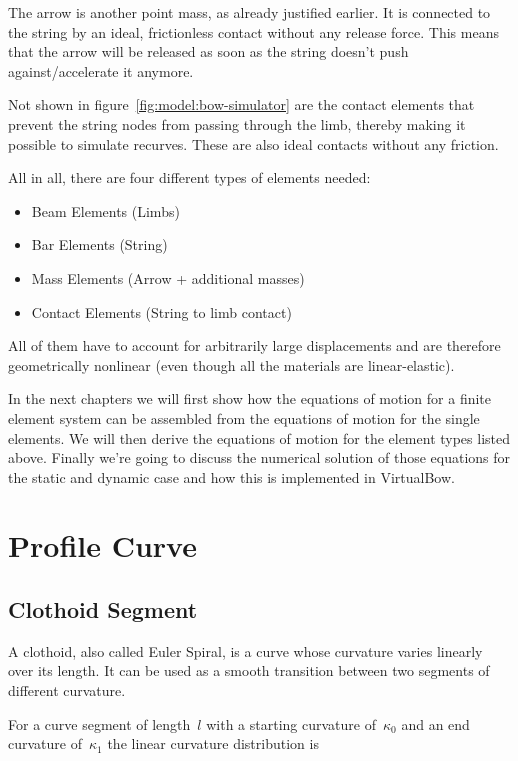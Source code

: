 The arrow is another point mass, as already justified earlier. It is connected to the string by an ideal, frictionless contact without any release force. This means that the arrow will be released as soon as the string doesn't push against/accelerate it anymore.

Not shown in figure~\ref{fig:model:bow-simulator} are the contact elements that prevent the string nodes from passing through the limb, thereby making it possible to simulate recurves. These are also ideal contacts without any friction.

All in all, there are four different types of elements needed:

\begin{itemize}
\item Beam Elements (Limbs)
\item Bar Elements (String)
\item Mass Elements (Arrow + additional masses)
\item Contact Elements (String to limb contact)
\end{itemize}

All of them have to account for arbitrarily large displacements and are therefore geometrically nonlinear (even though all the materials are linear-elastic).

In the next chapters we will first show how the equations of motion for a finite element system can be assembled from the equations of motion for the single elements. We will then derive the equations of motion for the element types listed above. Finally we're going to discuss the numerical solution of those equations for the static and dynamic case and how this is implemented in VirtualBow.

\section{Profile Curve}

\subsection*{Clothoid Segment}

A clothoid, also called Euler Spiral, is a curve whose curvature varies linearly over its length.
It can be used as a smooth transition between two segments of different curvature.

For a curve segment of length~$l$ with a starting curvature of~$\kappa_0$ and an end curvature of~$\kappa_1$ the linear curvature distribution is


